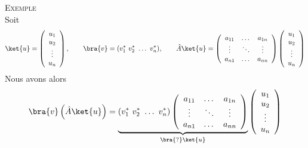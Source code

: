 \newpage
\textsc{Exemple}\\
Soit
\begin{equation}
\ket{u} = \left(\begin{array}{c}
u_1\\
u_2\\
\vdots\\
u_n
\end{array}\right), \qquad \bra{v} = (v_1^*\ v_2^*\ \dots\ v_n^*), \qquad 
\hat{A}\ket{u} = \left(\begin{array}{ccc}
a_{11} & \dots & a_{1n}\\
\vdots &\ddots &\vdots\\
a_{n1} & \dots & a_{nn}
\end{array}\right)\left(\begin{array}{c}
u_1\\
u_2\\
\vdots\\
u_n
\end{array}\right)
\end{equation}
Nous avons alors
\begin{equation}
\bra{v}\left(\hat{A}\ket{u}\right) = \underbrace{(v_1^*\ v_2^*\ \dots\ v_n^*)\left(\begin{array}{ccc}
a_{11} & \dots & a_{1n}\\
\vdots &\ddots &\vdots\\
a_{n1} & \dots & a_{nn}
\end{array}\right)}_{\bra{?}\ket{u}}\left(\begin{array}{c}
u_1\\
u_2\\
\vdots\\
u_n
\end{array}\right)
\end{equation}



